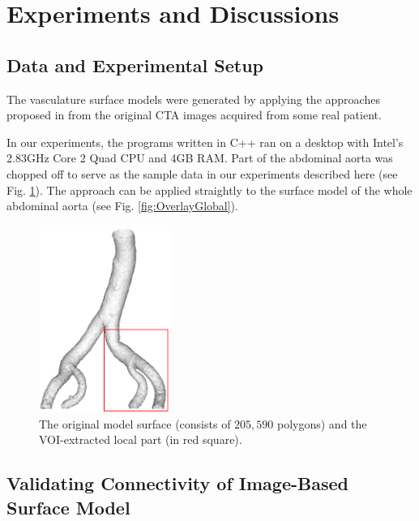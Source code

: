 \section{Experiments and Discussions}
\label{sec5_3}

\subsection{Data and Experimental Setup}

The vasculature surface models were generated by applying the approaches proposed in \cite{Yang2014ICRA} from the original CTA images acquired from some real patient.

In our experiments, the programs written in C++ ran on a desktop with Intel's 2.83GHz Core 2 Quad CPU and 4GB RAM.
Part of the abdominal aorta was chopped off to serve as the sample data in our experiments described here (see Fig. \ref{fig:VOI}). %
The approach can be applied straightly to the surface model of the whole abdominal aorta (see Fig. \ref{fig:OverlayGlobal}). %
\begin{figure}[t]
\centering
\includegraphics[height=2.4in]{Figures/chap05/VOI.png}
\caption{The original model surface (consists of $205,590$ polygons) and the VOI-extracted local part (in red square).}
\label{fig:VOI}
\end{figure}


\subsection{Validating Connectivity of Image-Based Surface Model}

